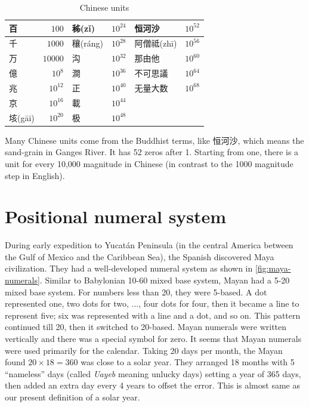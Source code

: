 \documentclass[b5paper]{article}
\begin{document}
\begin{table}[htbp]
  \centering
  \begin{tabular}{|l|r|l|r|l|r|}
  \hline
  百            & $100$      & 秭(z\v{i})    & $10^{24}$ &  恒河沙  & $10^{52}$ \\
  \hline
  千            & $1000$     & 穰(r\'{a}ng)  & $10^{28}$ & 阿僧祗(zh\={i})  & $10^{56}$ \\
  \hline
  万            & $10000$    & 沟            & $10^{32}$ & 那由他        & $10^{60}$  \\
  \hline
  億            & $10^8$     & 澗            & $10^{36}$ &  不可思議      & $10^{64}$ \\
  \hline
  兆            & $10^{12}$  & 正            & $10^{40}$ &  无量大数      & $10^{68}$ \\
  \hline
  京            & $10^{16}$  & 載            & $10^{44}$ &               & \\
  \hline
  垓(g\={a}i)   & $10^{20}$  & 极            & $10^{48}$ &               & \\
  \hline
  \end{tabular}
  \caption{Chinese units}
  \label{tab:units-cn}
\end{table}

Many Chinese units come from the Buddhist terms\cite{Noguchi2007}, like 恒河沙, which means the sand-grain in Ganges River. It has 52 zeros after 1. Starting from one, there is a unit for every 10,000 magnitude in Chinese (in contrast to the 1000 magnitude step in English).

\section{Positional numeral system}
  

During early expedition to Yucatán Peninsula (in the central America between the Gulf of Mexico and the Caribbean Sea), the Spanish discovered Maya civilization. They had a well-developed numeral system as shown in \cref{fig:maya-numerals}. Similar to Babylonian 10-60 mixed base system, Mayan had a 5-20 mixed base system. For numbers less than 20, they were 5-based. A dot represented one, two dots for two, ..., four dots for four, then it became a line to represent five; six was represented with a line and a dot, and so on. This pattern continued till 20, then it switched to 20-based. Mayan numerals were written vertically and there was a special symbol for zero. It seems that Mayan numerals were used primarily for the calendar. Taking 20 days per month, the Mayan found $20 \times 18 = 360$ was close to a solar year. They arranged 18 months with 5 \enquote{nameless} days (called \emph{Uayeb} meaning unlucky days) setting a year of 365 days, then added an extra day every 4 years to offset the error. This is almost same as our present definition of a solar year.
\end{document}
